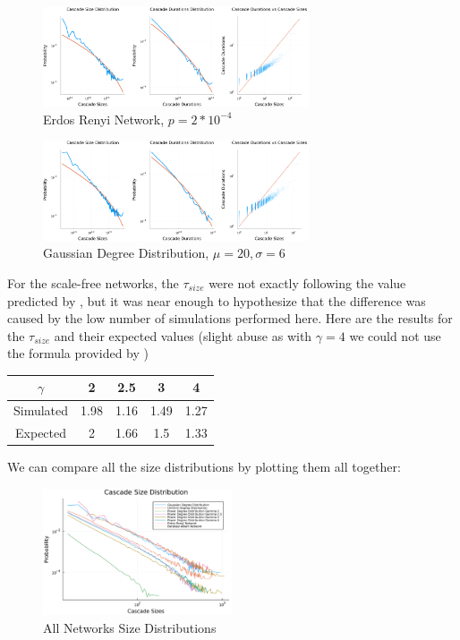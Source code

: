     \begin{figure}[H]
        \centering
        \includegraphics[width=0.7\textwidth]{images/Task15/ErdosRenyi.png}
        \caption{Erdos Renyi Network, $p = 2*10^{-4}$}
    \end{figure}

    \begin{figure}[H]
        \centering
        \includegraphics[width=0.7\textwidth]{images/Task15/RandomGaussian.png}
        \caption{Gaussian Degree Distribution, $\mu = 20, \sigma = 6$}
    \end{figure}

For the scale-free networks, the $\tau_{size}$ were not exactly following the value predicted by \cite{scale_free_sandpile}, but it was near enough to hypothesize that the difference was caused by the low number of simulations performed here. Here are the results for the $\tau_{size}$  and their expected values (slight abuse as with $\gamma=4$ we could not use the formula provided by \cite{scale_free_sandpile})
\begin{table}[H]
    \centering
    \begin{tabular}{|c|c|c|c|c|}
    \hline
    $\gamma$  & 2    & 2.5  & 3    & 4    \\ \hline
    Simulated & 1.98 & 1.16 & 1.49 & 1.27 \\ \hline
    Expected  & 2    & 1.66 & 1.5  & 1.33 \\ \hline
    \end{tabular}
\end{table}



We can compare all the size distributions by plotting them all together:

    \begin{figure}[H]
        \centering
        \includegraphics[width=0.5\textwidth]{images/Task15/AllNetworks.pdf}
        \caption{All Networks Size Distributions}
    \end{figure}

    
\newpage